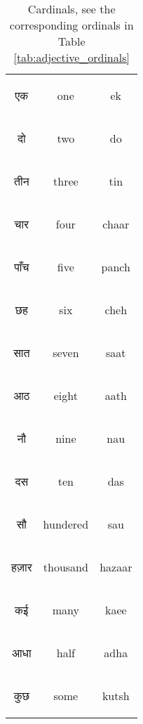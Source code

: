 \begin{table}[H]
    \centering
    \begin{tabular}{c|c|c}        
    \begin{hindi} एक \end{hindi} & one & ek \\
    \begin{hindi} दो  \end{hindi} & two & do \\
    \begin{hindi} तीन \end{hindi} & three & tin \\
    \begin{hindi} चार  \end{hindi} & four & chaar \\
    \begin{hindi} पाँच \end{hindi} & five & panch \\
    \begin{hindi} छह \end{hindi} & six & cheh \\
    \begin{hindi} सात \end{hindi} & seven & saat  \\
    \begin{hindi} आठ \end{hindi} & eight & aath \\
    \begin{hindi} नौ  \end{hindi} & nine & nau \\
    \begin{hindi} दस  \end{hindi} & ten & das \\
    \begin{hindi} सौ  \end{hindi} & hundered & sau \\
    \begin{hindi} हज़ार  \end{hindi} & thousand & hazaar \\
    \begin{hindi} कई  \end{hindi} & many & kaee \\
    \begin{hindi} आधा  \end{hindi} & half & adha \\
    \begin{hindi} कुछ  \end{hindi} & some & kutsh \\
    \end{tabular}
    \caption{Cardinals, see the corresponding ordinals in Table \ref{tab:adjective_ordinals}}
    \label{tab:nouns_cardinals}
\end{table}

